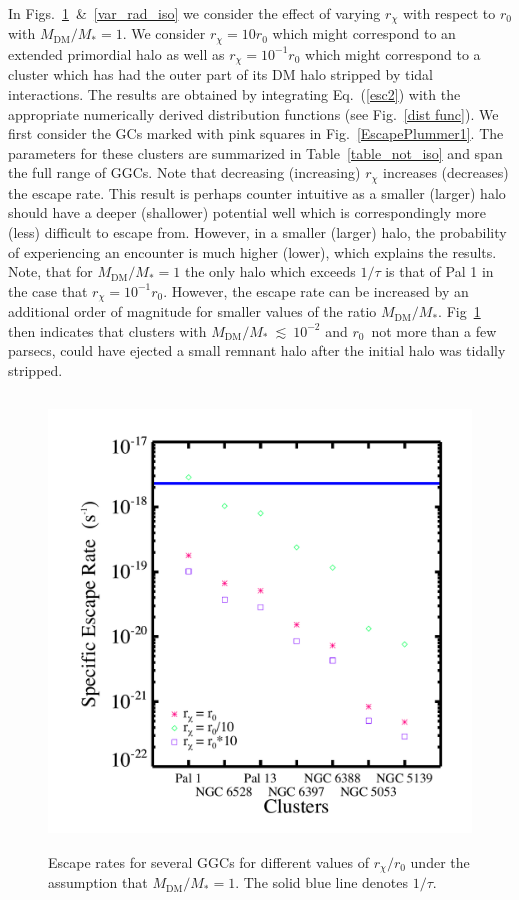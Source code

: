 \documentclass[aps,floatfix,prd,showpacs]{revtex4}
\newcommand{\rx}{r_\chi}
\newcommand{\MDM}{M_{\mathrm{DM}}}
\begin{document}
In Figs.~\ref{var_rad_not_iso}~\&~\ref{var_rad_iso} we consider the effect of varying $\rx$ with respect to $r_0$ with $\MDM/M_* = 1$.  We consider $\rx = 10r_0$ which might correspond to an extended primordial halo as well as $\rx = 10^{-1}r_0$ which might correspond to a cluster which has had the outer part of its DM halo stripped by tidal interactions.  The results are obtained by integrating Eq.~(\ref{esc2}) with the appropriate numerically derived distribution functions (see Fig.~\ref{dist func}).  We first consider the GCs marked with pink squares in Fig.~\ref{EscapePlummer1}.  The parameters for these clusters are summarized in Table~\ref{table_not_iso} and span the full range of GGCs.  Note that decreasing (increasing) $\rx$ increases (decreases) the escape rate.  This result is perhaps counter intuitive as a smaller (larger) halo should have a deeper (shallower) potential well which is correspondingly more (less) difficult to escape from.  However, in a smaller (larger) halo, the probability of experiencing an encounter is much higher (lower), which explains the results.  Note, that for $\MDM/M_* = 1$ the only halo which exceeds $1/\tau$ is that of Pal 1 in the case that $\rx = 10^{-1}r_0$.  However, the escape rate can be increased by an additional order of magnitude for smaller values of the ratio $\MDM/M_*$.  Fig~\ref{var_rad_not_iso} then indicates that clusters with $\MDM/M_*~\lesssim~10^{-2}$ and $r_0$~not more than a few parsecs, could have ejected a small remnant halo after the initial halo was tidally stripped.  
%
\begin{figure}[htp]
\centering
\includegraphics[width=12cm, height=12cm]{var_rad_not_iso}
\caption{Escape rates for several GGCs for different values of $\rx/r_0$ under the assumption that $\MDM/M_* = 1$.  The solid blue line denotes $1/\tau$.}  
\label{var_rad_not_iso}
\end{figure}
\end{document}
